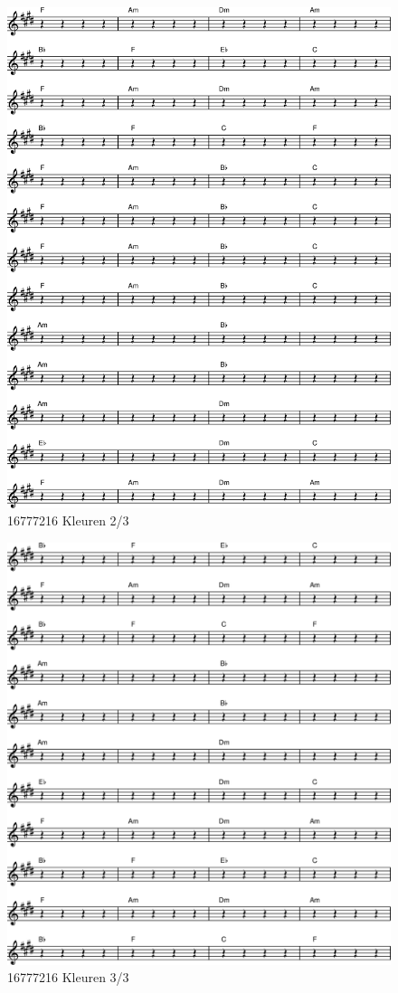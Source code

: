 \begin{figure}[!htbp]
  \includegraphics[width=\textwidth,height=\textheight,keepaspectratio]{../songs/64_16777216_kleuren-1.png}
  \caption{16777216 Kleuren 2/3}
  \label{fig:64_16777216_kleuren_2}
\end{figure}

\begin{figure}[!htbp]
  \includegraphics[width=\textwidth,height=\textheight,keepaspectratio]{../songs/64_16777216_kleuren-2.png}
  \caption{16777216 Kleuren 3/3}
  \label{fig:64_16777216_kleuren_3}
\end{figure}
